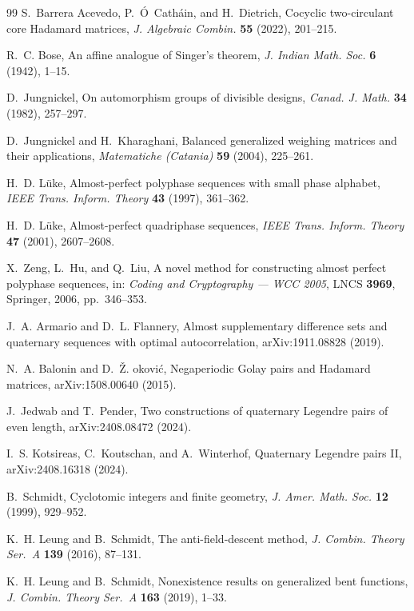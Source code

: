 \documentclass[11pt]{article}
\theoremstyle{plain}
\theoremstyle{definition}
\theoremstyle{remark}
\begin{document}
\begin{thebibliography}{99}
 S.~Barrera Acevedo, P.~\'O~Cath\'ain, and H.~Dietrich, Cocyclic
two-circulant core Hadamard matrices, \emph{J. Algebraic Combin.} \textbf{55}
(2022), 201--215.

 R.~C. Bose, An affine analogue of Singer's theorem,
\emph{J. Indian Math. Soc.} \textbf{6} (1942), 1--15.

 D.~Jungnickel, On automorphism groups of divisible
designs, \emph{Canad. J. Math.} \textbf{34} (1982), 257--297.

 D.~Jungnickel and H.~Kharaghani, Balanced generalized weighing
matrices and their applications, \emph{Matematiche (Catania)} \textbf{59}
(2004), 225--261.

 H.~D. L\"uke, Almost-perfect polyphase sequences with small
phase alphabet, \emph{IEEE Trans. Inform. Theory} \textbf{43} (1997), 361--362.

 H.~D. L\"uke, Almost-perfect quadriphase sequences,
\emph{IEEE Trans. Inform. Theory} \textbf{47} (2001), 2607--2608.

 X.~Zeng, L.~Hu, and Q.~Liu, A novel method for constructing
almost perfect polyphase sequences, in: \emph{Coding and Cryptography --- WCC
2005}, LNCS \textbf{3969}, Springer, 2006, pp.~346--353.

 J.~A. Armario and D.~L. Flannery, Almost supplementary difference
sets and quaternary sequences with optimal autocorrelation, arXiv:1911.08828
(2019).

 N.~A. Balonin and D.~\v{Z}. {\DJ}okovi\'c, Negaperiodic Golay
pairs and Hadamard matrices, arXiv:1508.00640 (2015).

 J.~Jedwab and T.~Pender, Two constructions of quaternary Legendre
pairs of even length, arXiv:2408.08472 (2024).

 I.~S. Kotsireas, C.~Koutschan, and A.~Winterhof, Quaternary
Legendre pairs II, arXiv:2408.16318 (2024).

 B.~Schmidt, Cyclotomic integers and finite geometry,
\emph{J. Amer. Math. Soc.} \textbf{12} (1999), 929--952.

 K.~H. Leung and B.~Schmidt, The anti-field-descent method,
\emph{J. Combin. Theory Ser.~A} \textbf{139} (2016), 87--131.

 K.~H. Leung and B.~Schmidt, Nonexistence results on generalized
bent functions, \emph{J. Combin. Theory Ser.~A} \textbf{163} (2019), 1--33.


\end{thebibliography}
\end{document}
